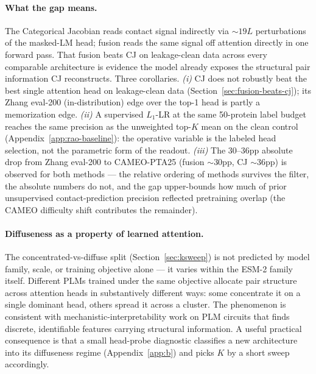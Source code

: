 \documentclass{article}
\begin{document}
\paragraph{What the gap means.}
The Categorical Jacobian reads contact signal indirectly via
$\sim 19L$ perturbations of the masked-LM head; fusion reads the same
signal off attention directly in one forward pass. That fusion beats
CJ on leakage-clean data across every comparable architecture is
evidence the model already exposes the structural pair information CJ
reconstructs. Three corollaries. \emph{(i)} CJ does not robustly beat
the best single attention head on leakage-clean data
(Section~\ref{sec:fusion-beats-cj}); its Zhang eval-200 (in-distribution) edge over the
top-1 head is partly a memorization edge. \emph{(ii)} A supervised
$L_1$-LR at the same 50-protein label budget reaches the same
precision as the unweighted top-$K$ mean on the clean control
(Appendix~\ref{app:rao-baseline}): the operative variable is the
labeled head selection, not the parametric form of the readout.
\emph{(iii)} The 30--36pp absolute drop from Zhang eval-200 to
CAMEO-PTA25 (fusion $\sim$30pp, CJ $\sim$36pp) is observed for both
methods --- the relative ordering of methods survives the filter, the
absolute numbers do not, and the gap upper-bounds how much of prior
unsupervised contact-prediction precision reflected pretraining overlap
(the CAMEO difficulty shift contributes the remainder).

\paragraph{Diffuseness as a property of learned attention.}
The concentrated-vs-diffuse split (Section~\ref{sec:ksweep}) is not
predicted by model family, scale, or training objective alone --- it
varies within the ESM-2 family itself. Different PLMs trained under the
same objective allocate pair structure across attention heads in
substantively different ways: some concentrate it on a single dominant
head, others spread it across a cluster. The phenomenon is consistent
with mechanistic-interpretability work on PLM circuits
\citep{adams2025plmsae,simon2025interplm} that finds discrete,
identifiable features carrying structural information. A useful
practical consequence is that a small head-probe diagnostic
classifies a new architecture into its diffuseness regime
(Appendix~\ref{app:b}) and picks $K$ by a short sweep accordingly.
\end{document}
